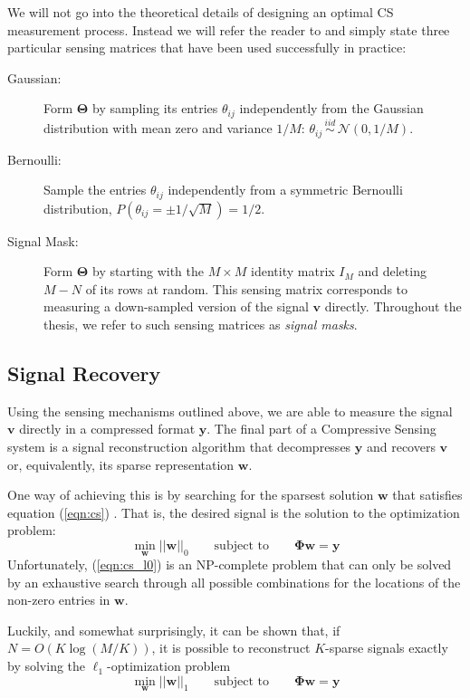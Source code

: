 We will not go into the theoretical details of designing an optimal CS measurement process. Instead we will refer the reader to \cite{candes2008} and simply state three particular sensing matrices that have been used successfully in practice:
\begin{description}
\item[Gaussian:] Form $\bm\Theta$ by sampling its entries $\theta_{ij}$ independently from the Gaussian distribution with mean zero and variance $1/M$: $\theta_{ij}\, \stackrel{iid}{\sim}\, \mathcal{N}(0,1/M)$.
\item[Bernoulli:] Sample the entries $\theta_{ij}$ independently from a symmetric Bernoulli distribution, $P(\theta_{ij} = \pm 1/\sqrt{M}) = 1/2$. 
\item[Signal Mask:] Form $\bm\Theta$ by starting with the $M\times M$ identity matrix $I_M$ and deleting $M-N$ of its rows at random. This sensing matrix corresponds to measuring a down-sampled version of the signal $\bm v$ directly. Throughout the thesis, we refer to such sensing matrices as \emph{signal masks}. 
\end{description}

\subsection{Signal Recovery}
Using the sensing mechanisms outlined above, we are able to measure the signal $\bm v$ directly in a compressed format $\bm y$.
The final part of a Compressive Sensing system is a signal reconstruction algorithm that decompresses $\bm y$ and recovers $\bm v$ or, equivalently, its sparse representation $\bm w$.

One way of achieving this is by searching for the sparsest solution $\bm w$ that satisfies equation (\ref{eqn:cs}) \cite{baraniuk2007}.
That is, the desired signal is the solution to the optimization problem:
\begin{equation}
\label{eqn:cs_l0}
  \min_{\bm w} ||\bm w||_0 \qquad \mbox{subject to} \qquad \bm\Phi\bm w = \bm y
\end{equation}
Unfortunately, (\ref{eqn:cs_l0}) is an NP-complete problem that can only be solved by an exhaustive search through all possible combinations for the locations of the non-zero entries in $\bm w$.

Luckily, and somewhat surprisingly, it can be shown that, if $N = O(K\log(M/K))$, it is possible to reconstruct $K$-sparse signals exactly by solving the $\ell_1$-optimization problem \cite{baraniuk2007,candes2008}
\begin{equation}
\label{eqn:cs_l1}
  \min_{\bm w} ||\bm w||_1 \qquad \mbox{subject to} \qquad \bm\Phi\bm w = \bm y
\end{equation}

